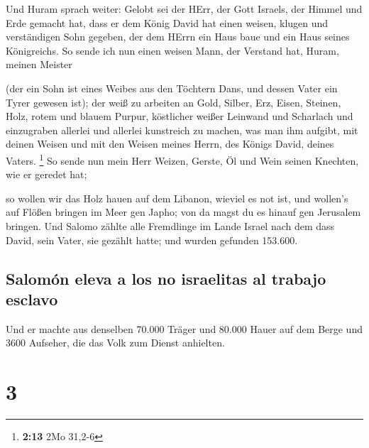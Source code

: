  Und Huram sprach weiter: Gelobt sei der HErr, der Gott
Israels, der Himmel und Erde gemacht hat, dass er dem König David hat
einen weisen, klugen und verständigen Sohn gegeben, der dem HErrn ein
Haus baue und ein Haus seines Königreichs.  So sende ich
nun einen weisen Mann, der Verstand hat, Huram, meinen Meister

 (der ein Sohn ist eines Weibes aus den Töchtern Dans,
und dessen Vater ein Tyrer gewesen ist); der weiß zu arbeiten an Gold,
Silber, Erz, Eisen, Steinen, Holz, rotem und blauem Purpur, köstlicher
weißer Leinwand und Scharlach und einzugraben allerlei und allerlei
kunstreich zu machen, was man ihm aufgibt, mit deinen Weisen und mit den
Weisen meines Herrn, des Königs David, deines Vaters. \footnote{\textbf{2:13}
  2Mo 31,2-6}  So sende nun mein Herr Weizen, Gerste, Öl
und Wein seinen Knechten, wie er geredet hat;

 so wollen wir das Holz hauen auf dem Libanon, wieviel es
not ist, und wollen's auf Flößen bringen im Meer gen Japho; von da magst
du es hinauf gen Jerusalem bringen.  Und Salomo zählte
alle Fremdlinge im Lande Israel nach dem dass David, sein Vater, sie
gezählt hatte; und wurden gefunden 153.600.

\hypertarget{salomuxf3n-eleva-a-los-no-israelitas-al-trabajo-esclavo}{%
\subsection{Salomón eleva a los no israelitas al trabajo
esclavo}\label{salomuxf3n-eleva-a-los-no-israelitas-al-trabajo-esclavo}}

 Und er machte aus denselben 70.000 Träger und 80.000
Hauer auf dem Berge und 3600 Aufseher, die das Volk zum Dienst
anhielten.

\hypertarget{section-2}{%
\section{3}\label{section-2}}

